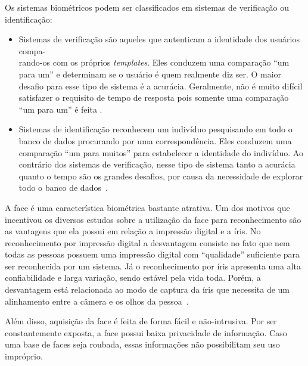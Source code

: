 	Os sistemas biométricos podem ser classificados em sistemas de verificação ou
	identificação:
	
	\begin{itemize}
		\item Sistemas de verificação são aqueles que autenticam a identidade
		dos usuários compa-\\rando-os com os próprios \textit{templates}. Eles
		conduzem uma comparação ``um para um'' e determinam se o usuário é quem realmente diz ser. O
		maior desafio para esse tipo de sistema é a acurácia. Geralmente, não é muito
		difícil satisfazer o requisito de tempo de resposta pois somente uma comparação
		``um para um'' é feita \cite{hong}.
	
		\item Sistemas de identificação reconhecem um indivíduo pesquisando em todo o
		banco de dados procurando por uma correspondência. Eles conduzem uma comparação ``um para
		muitos'' para estabelecer a identidade do indivíduo. Ao contrário dos sistemas
		de verificação, nesse tipo de sistema tanto a acurácia quanto o tempo são os
		grandes desafios, por causa da necessidade de explorar todo o banco de dados~\cite{hong}.
	\end{itemize}
	
	A face é uma característica biométrica bastante atrativa. Um dos motivos que
	incentivou os diversos estudos sobre a utilização da face para reconhecimento
	são as vantagens que ela possui em relação a impressão digital e a íris.  No
	reconhecimento por impressão digital a desvantagem consiste no fato que nem
	todas as pessoas possuem uma impressão digital com ``qualidade'' suficiente para
	ser reconhecida por um sistema. Já o reconhecimento por íris apresenta uma alta
	confiabilidade e larga variação, sendo estável pela vida toda. Porém, a
	desvantagem está relacionada ao modo de captura da íris que necessita de um
	alinhamento entre a câmera e os olhos da pessoa~\cite{saocarlos}.
	
	Além disso, aquisição da face é feita de forma fácil e não-intrusiva. Por ser
	constantemente exposta, a face possui baixa privacidade de informação. Caso uma
	base de faces seja roubada, essas informações não possibilitam seu uso
	impróprio.
